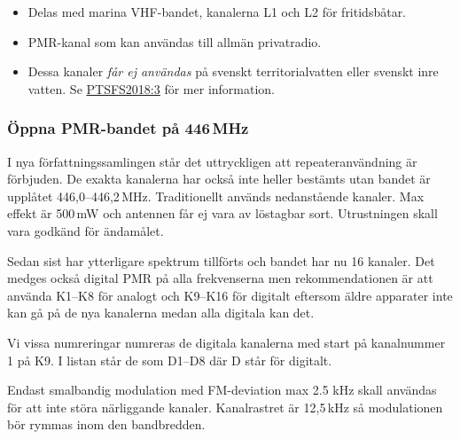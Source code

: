 \footnotesize
\begin{itemize}
	\item[$^M$] Delas med marina VHF-bandet, kanalerna L1 och L2 för fritidsbåtar.
	\item[$^P$] PMR-kanal som kan användas till allmän privatradio.
	\item[$^R$] Dessa kanaler \textit{får ej användas} på svenskt territorialvatten eller svenskt inre vatten. Se \href{https://pts.se/globalassets/startpage/dokument/legala-dokument/foreskrifter/radio/beslutade_ptsfs-2018-3-undantagsforeskrifter.pdf}{PTSFS2018:3} för mer information.
\end{itemize}
\normalsize

\subsubsection{Öppna PMR-bandet på 446\,MHz}

I nya författningssamlingen står det uttryckligen att repeateranvändning är 
förbjuden. De exakta kanalerna har också inte heller bestämts utan bandet är 
upplåtet 446,0--446,2\,MHz. Traditionellt används nedanstående kanaler. Max 
effekt är 500\,mW och antennen får ej vara av löstagbar sort. Utrustningen 
skall vara godkänd för ändamålet.

Sedan sist har ytterligare spektrum tillförts och bandet har nu 16 kanaler. Det medges också digital PMR på alla frekvenserna men rekommendationen är att använda K1--K8 för analogt och K9--K16 för digitalt eftersom äldre apparater inte kan gå på de nya kanalerna medan alla digitala kan det.

Vi vissa numreringar numreras de digitala kanalerna med start på kanalnummer 1 på K9. I listan står de som D1--D8 där D står för digitalt.

Endast smalbandig modulation med FM-deviation max 2.5 kHz skall användas för att inte störa närliggande kanaler. Kanalrastret är 12,5\,kHz så modulationen bör rymmas inom den bandbredden.
 
